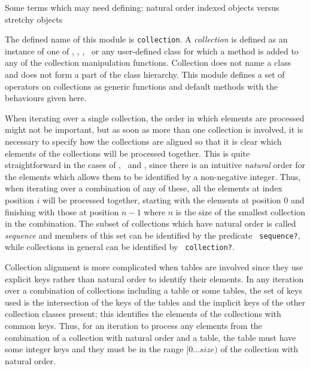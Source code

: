 \label{collection}
%
\begin{optPrivate}
    Some terms which may need defining: natural order indexed objects versus
    stretchy objects
\end{optPrivate}
%
\begin{optDefinition}
%
The defined name of this module is {\tt collection}.  A {\em collection\/} is
defined as an instance of one of , ,
, \ or any user-defined class for which a
method is added to any of the collection manipulation functions.  Collection
does not name a class and does not form a part of the class hierarchy.  This
module defines a set of operators on collections as generic functions and
default methods with the behaviours given here.

When iterating over a single collection, the order in which elements are
processed might not be important, but as soon as more than one collection is
involved, it is necessary to specify how the collections are
aligned so that it is clear which elements
of the collections will be processed together.  This is quite straightforward in
the cases of , \ and , since
there is an intuitive {\em natural\/} order for the elements which allows them
to be identified by a non-negative integer.  Thus, when iterating over a
combination of any of these, all the elements at index position $i$ will be
processed together, starting with the elements at position $0$ and finishing
with those at position $n-1$ where $n$ is the size of the smallest collection in
the combination.  The subset of collections which have natural order is called
{\em sequence\/} and members of this set can be identified by the predicate {\tt
    sequence?}, while collections in general can be identified by {\tt
    collection?}.

Collection alignment is more complicated when tables are involved since they use
explicit keys rather than natural order to identify their elements.  In any
iteration over a combination of collections including a table or some tables,
the set of keys used is the intersection of the keys of the tables and the
implicit keys of the other collection classes present; this identifies the
elements of the collections with common keys.  Thus, for an iteration to process
any elements from the combination of a collection with natural order and a
table, the table must have some integer keys and they must be in the range
$[0\ldots{}size)$ of the collection with natural order.


\end{optDefinition}
